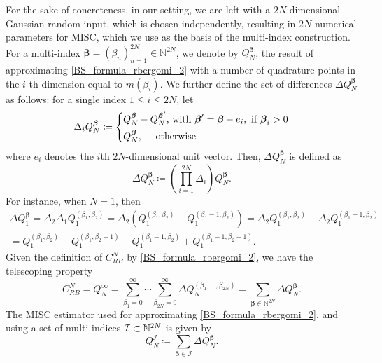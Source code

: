 For the sake of concreteness, in our setting, we are left with a $2N$-dimensional Gaussian random input, which is chosen independently, resulting in  $2N$ numerical parameters for MISC, which we use as the basis of the multi-index construction. For a multi-index $\boldsymbol{\beta} = (\beta_n)_{n=1}^{2N} \in \mathbb{N}^{2N}$, we denote  by
$Q_N^{\boldsymbol{\beta}}$,   the result of approximating \eqref{BS_formula_rbergomi_2} with a number of quadrature points  in the $i$-th dimension equal to  $m(\beta_i)$. We further define the set of
differences $\Delta Q_N^{\boldsymbol{\beta}}$ as follows: for a single index $1 \le i \le 2N$,
let
\begin{equation}
\Delta_i Q_N^{\boldsymbol{\beta}} \coloneqq \left\{ 
\aligned 
 Q_N^{\boldsymbol{\beta}} &- Q_N^{\boldsymbol{\beta}'}  \text{, with } \boldsymbol{\beta}' =\boldsymbol{\beta} - e_i, \text{ if } \boldsymbol{\beta}_i>0 \\
 Q_N^{\boldsymbol{\beta}} &, \quad  \text{ otherwise}
\endaligned
\right.
\end{equation}
where $e_i$ denotes the $i$th $2N$-dimensional unit vector. Then, $\Delta
Q_N^{\boldsymbol{\beta}}$ is defined as
\begin{equation}
\Delta Q_N^{\boldsymbol{\beta}} \coloneqq \left( \prod_{i=1}^{2N} \Delta_i \right) Q_N^{\boldsymbol{\beta}}.
\end{equation}
For instance, when $N = 1$, then 
\begin{multline*}
	\Delta Q_1^{\boldsymbol{\beta}} = \Delta_2 \Delta_1 Q_1^{(\beta_1, \beta_2)} = \Delta_2\left( Q_1^{(\beta_1,
		\beta_2)} - Q_1^{(\beta_1-1,\beta_2)} \right) = \Delta_2 Q_1^{(\beta_1,
		\beta_2)} - \Delta_2 Q_1^{(\beta_1-1,\beta_2)} 
	\\= Q_1^{(\beta_1, \beta_2)} - Q_1^{(\beta_1, \beta_2-1)} - Q_1^{(\beta_1-1, \beta_2)} + Q_1^{(\beta_1-1, \beta_2-1)}.
\end{multline*}
Given the definition of $C_{RB}^{N}$ by \eqref{BS_formula_rbergomi_2}, we have the telescoping property
\begin{equation}
C_{RB}^{N}=Q_N^\infty = \sum_{\beta_1=0}^\infty \cdots \sum_{\beta_{2N} = 0}^\infty \Delta
Q_N^{(\beta_1, \ldots, \beta_{2N})} = \sum_{\boldsymbol{\beta} \in \mathbb{N}^{2N}} \Delta Q_N^{\boldsymbol{\beta}}.
\end{equation}
 The MISC estimator used for approximating \eqref{BS_formula_rbergomi_2}, and using a set of multi-indices $\mathcal{I}\subset \mathbb{N}^{2N}$ is given by
\begin{equation*}
	Q_N^{\mathcal{I}} \coloneqq \sum_{\boldsymbol{\beta} \in \mathcal{I}} \Delta Q_N^{\boldsymbol{\beta}}.
\end{equation*}
